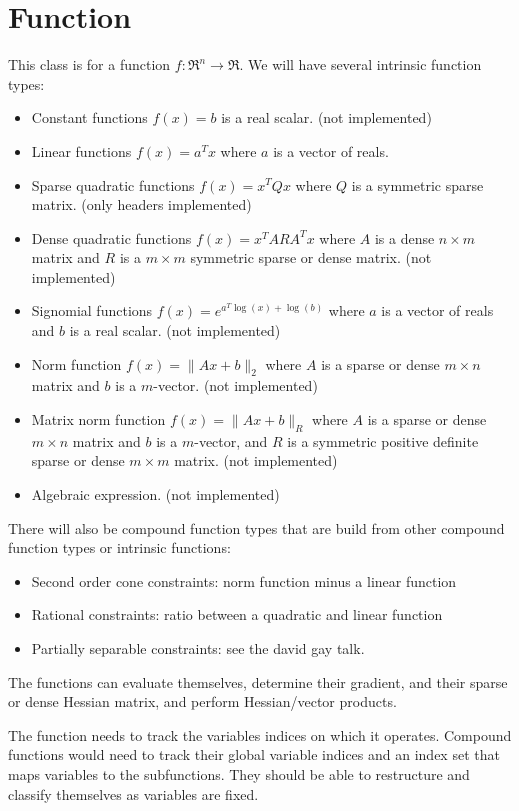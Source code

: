 \documentclass[10pt]{report}
\newcommand{\notimpl}[0]{(not implemented)}
\newcommand{\honly}[0]{(only headers implemented)}
\begin{document}
\section{Function}
This class is for a function $f: \Re^n \rightarrow \Re$.  We will have
several intrinsic function types:
\begin{itemize}
\item Constant functions $f(x) = b$ is a real scalar. \notimpl
\item Linear functions $f(x) = a^Tx$ where $a$ is a vector of reals. 
\item Sparse quadratic functions $f(x) = x^T Q x$ where $Q$ is a symmetric 
      sparse matrix. \honly
\item Dense quadratic functions $f(x) = x^T A R A^T x$ where $A$ is a 
      dense $n\times m$ matrix and $R$ is a $m\times m$ symmetric sparse
      or dense matrix. \notimpl
\item Signomial functions $f(x) = e^{a^T \log(x) + \log(b)}$ where $a$
      is a vector of reals and $b$ is a real scalar. \notimpl
\item Norm function $f(x) = \| Ax + b \|_2$ where $A$ is a sparse
      or dense $m \times n$ matrix and $b$ is a $m$-vector. \notimpl
\item Matrix norm function $f(x) = \| Ax + b \|_R$ where $A$ is a sparse
      or dense $m \times n$ matrix and $b$ is a $m$-vector, and $R$ is
      a symmetric positive definite sparse or dense $m\times m$ matrix.
      \notimpl
\item Algebraic expression. \notimpl
\end{itemize}

There will also be compound function types that are build from other
compound function types or intrinsic functions:
\begin{itemize}
\item Second order cone constraints: norm function minus a linear function
\item Rational constraints: ratio between a quadratic and linear function
\item Partially separable constraints: see the david gay talk.
\end{itemize}

The functions can evaluate themselves, determine their gradient, and
their sparse or dense Hessian matrix, and perform Hessian/vector
products.

The function needs to track the variables indices on which it operates.
Compound functions would need to track their global variable indices and
an index set that maps variables to the subfunctions.  They should be
able to restructure and classify themselves as variables are fixed.
\end{document}
